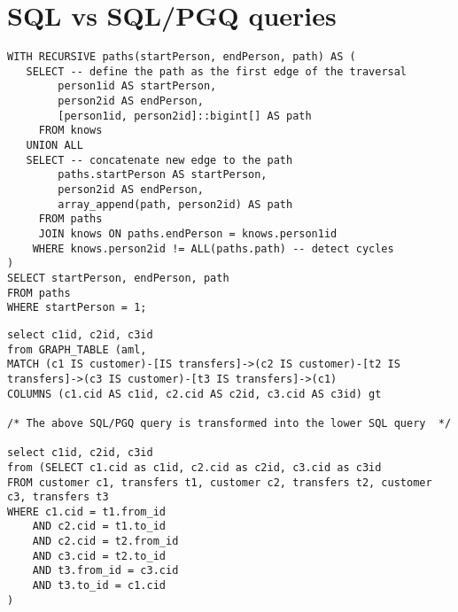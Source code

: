 \section{SQL vs SQL/PGQ queries}\label{app:sqlvssqlpgq}



\begin{lstlisting}[caption=SQL query WITH RECURSIVE, label=app:sqlquery1] 
WITH RECURSIVE paths(startPerson, endPerson, path) AS (
   SELECT -- define the path as the first edge of the traversal
        person1id AS startPerson,
        person2id AS endPerson,
        [person1id, person2id]::bigint[] AS path
     FROM knows
   UNION ALL
   SELECT -- concatenate new edge to the path
        paths.startPerson AS startPerson,
        person2id AS endPerson,
        array_append(path, person2id) AS path
     FROM paths
     JOIN knows ON paths.endPerson = knows.person1id
    WHERE knows.person2id != ALL(paths.path) -- detect cycles
)
SELECT startPerson, endPerson, path
FROM paths
WHERE startPerson = 1;
\end{lstlisting}

\begin{lstlisting}[caption=SQL/PGQ query transformed into SQL query, label=app:sqlpgqquery2] 
select c1id, c2id, c3id 
from GRAPH_TABLE (aml, 
MATCH (c1 IS customer)-[IS transfers]->(c2 IS customer)-[t2 IS transfers]->(c3 IS customer)-[t3 IS transfers]->(c1) 
COLUMNS (c1.cid AS c1id, c2.cid AS c2id, c3.cid AS c3id) gt

/* The above SQL/PGQ query is transformed into the lower SQL query  */

select c1id, c2id, c3id 
from (SELECT c1.cid as c1id, c2.cid as c2id, c3.cid as c3id
FROM customer c1, transfers t1, customer c2, transfers t2, customer c3, transfers t3
WHERE c1.cid = t1.from_id
    AND c2.cid = t1.to_id
    AND c2.cid = t2.from_id
    AND c3.cid = t2.to_id
    AND t3.from_id = c3.cid 
    AND t3.to_id = c1.cid
)
\end{lstlisting}

